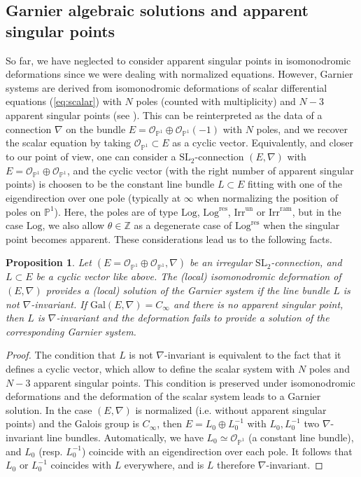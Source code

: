 \documentclass[12]{amsart}
\newtheorem{prop}[thm]{Proposition}
\newcommand{\SL}{\mathrm{SL}_2}
\newcommand{\Log}{\boldsymbol{\mathrm{Log}}}
\newcommand{\Logres}{\boldsymbol{\mathrm{Log}^{\mathrm{res}}}}
\newcommand{\Irrun}{\boldsymbol{\mathrm{Irr}^{\mathrm{un}}}}
\newcommand{\Irram}{\boldsymbol{\mathrm{Irr}^{\mathrm{ram}}}}
\begin{document}
\subsection{Garnier algebraic solutions and apparent singular points}
So far, we have neglected to consider apparent singular points in isomonodromic deformations
since we were dealing with normalized equations. However, Garnier systems are derived from 
isomonodromic deformations of scalar differential equations (\ref{eq:scalar}) with $N$
poles (counted with multiplicity) and $N-3$ apparent singular points (see \cite{Kimura,Kawamuko}). 
This can be reinterpreted as the data of a connection $\nabla$ on the bundle 
$E=\mathcal O_{\mathbb P^1}\oplus\mathcal O_{\mathbb P^1}(-1)$ with $N$ poles, 
and we recover the scalar equation by taking $\mathcal O_{\mathbb P^1}\subset E$ as a cyclic vector.
Equivalently, and closer to our point of view, one can consider a $\SL$-connection $(E,\nabla)$
with $E=\mathcal O_{\mathbb P^1}\oplus\mathcal O_{\mathbb P^1}$, 
and the cyclic vector (with the right number of apparent singular points) is choosen to be
the constant line bundle $L\subset E$ fitting with one of the eigendirection over one pole (typically at $\infty$
when normalizing the position of poles on $\mathbb P^1$).
Here, the poles are of type $\Log$, $\Logres$, $\Irrun$ or $\Irram$, but in the case $\Log$, we also
allow $\theta\in\mathbb Z$ as a degenerate case of $\Logres$ when the singular point becomes apparent.
These considerations lead us to the following facts.

\begin{prop}\label{prop:cyclicvector}
Let $(E=\mathcal O_{\mathbb P^1}\oplus\mathcal O_{\mathbb P^1},\nabla)$ be an irregular $\SL$-connection, 
and $L\subset E$ be a cyclic vector like above.
The (local) isomonodromic deformation of $(E,\nabla)$ provides a (local) solution of the Garnier system
if the line bundle $L$ is not $\nabla$-invariant. If $\mathrm{Gal}(E,\nabla)=C_\infty$ and there is no apparent singular point,
then $L$ is $\nabla$-invariant and the deformation fails to provide a solution of the corresponding Garnier system.
\end{prop}

\begin{proof} The condition that $L$ is not $\nabla$-invariant is equivalent to the fact that it defines
a cyclic vector, which allow to define the scalar system with $N$ poles and $N-3$ apparent singular points.
This condition is preserved under isomonodromic deformations and the deformation of the scalar system
leads to a Garnier solution. In the case $(E,\nabla)$ is normalized (i.e. without apparent singular points)
and the Galois group is $C_\infty$, then $E=L_0\oplus L_0^{-1}$ with $L_0,L_0^{-1}$ two $\nabla$-invariant line bundles.
Automatically, we have $L_0\simeq\mathcal O_{\mathbb P^1}$ (a constant line bundle), and $L_0$ (resp. $L_0^{-1}$)
coincide with an eigendirection over each pole. It follows that $L_0$ or $L_0^{-1}$ coincides with $L$
everywhere, and is $L$ therefore $\nabla$-invariant.
\end{proof}
\end{document}

